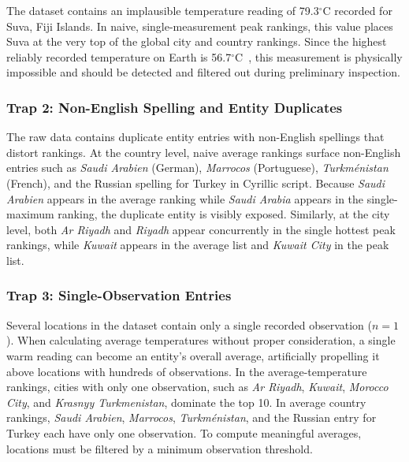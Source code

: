 The dataset contains an implausible temperature reading of 79.3$^\circ$C recorded for Suva, Fiji Islands.
In naive, single-measurement peak rankings, this value places Suva at the very top of the global city and country rankings.
Since the highest reliably recorded temperature on Earth is 56.7$^\circ$C~\cite{world_record_temp}, this measurement is physically impossible and should be detected and filtered out during preliminary inspection.

\subsubsection{Trap 2: Non-English Spelling and Entity Duplicates}
\label{subsubsec:trap-entity-duplicates}

The raw data contains duplicate entity entries with non-English spellings that distort rankings.
At the country level, naive average rankings surface non-English entries such as \textit{Saudi Arabien} (German), \textit{Marrocos} (Portuguese), \textit{Turkm\'enistan} (French), and the Russian spelling for Turkey in Cyrillic script.
Because \textit{Saudi Arabien} appears in the average ranking while \textit{Saudi Arabia} appears in the single-maximum ranking, the duplicate entity is visibly exposed.
Similarly, at the city level, both \textit{Ar Riyadh} and \textit{Riyadh} appear concurrently in the single hottest peak rankings, while \textit{Kuwait} appears in the average list and \textit{Kuwait City} in the peak list.

\subsubsection{Trap 3: Single-Observation Entries}
\label{subsubsec:trap-single-observation}

Several locations in the dataset contain only a single recorded observation ($n=1$).
When calculating average temperatures without proper consideration, a single warm reading can become an entity's overall average, artificially propelling it above locations with hundreds of observations.
In the average-temperature rankings, cities with only one observation, such as \textit{Ar Riyadh}, \textit{Kuwait}, \textit{Morocco City}, and \textit{Krasnyy Turkmenistan}, dominate the top 10.
In average country rankings, \textit{Saudi Arabien}, \textit{Marrocos}, \textit{Turkm\'enistan}, and the Russian entry for Turkey each have only one observation.
To compute meaningful averages, locations must be filtered by a minimum observation threshold.

